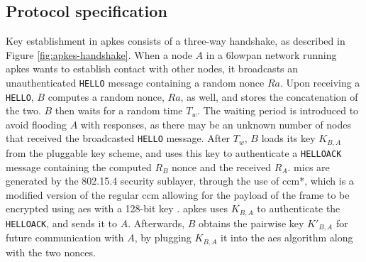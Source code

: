 


\subsection{Protocol specification}
\label{subsec:apkes-spec}

Key establishment in \gls{apkes} consists of a three-way handshake, as described in Figure \ref{fig:apkes-handshake}. When a node $A$ in a \gls{6lowpan} network running \gls{apkes} wants to establish contact with other nodes, it broadcasts an unauthenticated \texttt{HELLO} message containing a random nonce $Ra$. Upon receiving a \texttt{HELLO}, $B$ computes a random nonce, $Ra$, as well, and stores the concatenation of the two. $B$ then waits for a random time $T_w$. The waiting period is introduced to avoid flooding $A$ with responses, as there may be an unknown number of nodes that received the broadcasted \texttt{HELLO} message. After $T_w$, $B$ loads its key $K_{B,A}$ from the pluggable key scheme, and uses this key to authenticate a \texttt{HELLOACK} message containing the computed $R_B$ nonce and the received $R_A$. \gls{mic}s are generated by the 802.15.4 security sublayer, through the use of \gls{ccm}*, which is a modified version of the regular \gls{ccm} allowing for the payload of the frame to be encrypted using \gls{aes} with a 128-bit key \cite{krentz20136lowpan}. \gls{apkes} uses $K_{B,A}$ to authenticate the \texttt{HELLOACK}, and sends it to $A$. Afterwards, $B$ obtains the pairwise key $K'_{B,A}$ for future communication with $A$, by plugging $K_{B,A}$ it into the \gls{aes} algorithm along with the two nonces.


